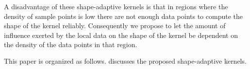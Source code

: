 A disadvantage of these shape-adaptive kernels is that in regions where the density of sample points is low there are not enough data points to compute the shape of the kernel reliably. Consequently we propose to let the amount of influence exerted by the local data on the shape of the kernel be dependent on the density of the data points in that region.

This paper is organized as follows.  discusses the proposed shape-adaptive kernels. 